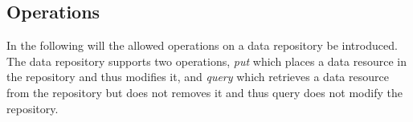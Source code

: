 \subsection{Operations}
In the following will the allowed operations on a data repository be introduced. The data repository supports two operations, \emph{put} which places a data resource in the repository and thus modifies it, and \emph{query} which retrieves a data resource from the repository but does not removes it and thus query does not modify the repository.

